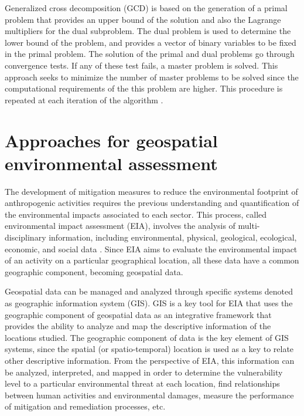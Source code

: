 \begin{refsection}[referencesCh1]
Generalized cross decomposition (GCD) is based on the generation of a primal problem that provides an upper bound of the solution and also the Lagrange multipliers for the dual subproblem. The dual problem is used to determine the lower bound of the problem, and provides a vector of binary variables to be fixed in the primal problem. The solution of the primal and dual problems go through convergence tests. If any of these test fails, a master problem is solved. This approach seeks to minimize the number of master problems to be solved since the computational requirements of the this problem are higher. This procedure is repeated at each iteration of the algorithm \citep{floudas1995nonlinear}.

\section{Approaches for geospatial environmental assessment}
The development of mitigation measures to reduce the environmental footprint of anthropogenic activities requires the previous understanding and quantification of the environmental impacts associated to each sector. This process, called environmental impact assessment (EIA), involves the analysis of multi-disciplinary information, including environmental, physical, geological, ecological, economic, and social data \citep{gharehbaghi2018gis}. Since EIA aims to evaluate the environmental impact of an activity on a particular geographical location, all these data have a common geographic component, becoming geospatial data.

Geospatial data can be managed and analyzed through specific systems denoted as geographic information system (GIS). GIS is a key tool for EIA that uses the geographic component of geospatial data as an integrative framework that provides the ability to analyze and map the descriptive information of the locations studied. The geographic component of data is the key element of GIS systems, since the spatial (or spatio-temporal) location is used as a key to relate other descriptive information. From the perspective of EIA, this information can be analyzed, interpreted, and mapped in order to determine the vulnerability level to a particular environmental threat at each location, find relationships between human activities and environmental damages, measure the performance of mitigation and remediation processes, etc.


\end{refsection}
